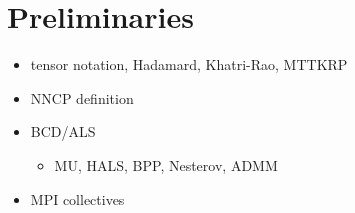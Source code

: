 \section{Preliminaries} 
\label{sec:prelims}

\begin{itemize}
	\item tensor notation, Hadamard, Khatri-Rao, MTTKRP
	\item NNCP definition
	\item BCD/ALS
	\begin{itemize}
		\item MU, HALS, BPP, Nesterov, ADMM
	\end{itemize}
	\item MPI collectives
\end{itemize}
